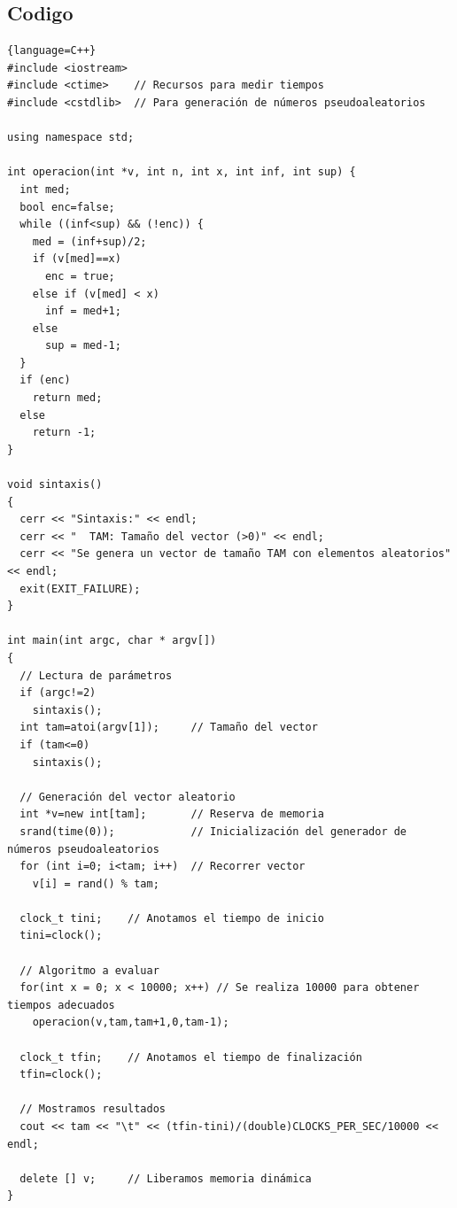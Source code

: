 \documentclass[12pt,a4psprt]{article}
\begin{document}
\subsection{Codigo}
\begin{lstlisting}{language=C++}
#include <iostream>
#include <ctime>    // Recursos para medir tiempos
#include <cstdlib>  // Para generación de números pseudoaleatorios

using namespace std;

int operacion(int *v, int n, int x, int inf, int sup) {
  int med;
  bool enc=false;
  while ((inf<sup) && (!enc)) {
    med = (inf+sup)/2; 
    if (v[med]==x) 
      enc = true;
    else if (v[med] < x) 
      inf = med+1;
    else
      sup = med-1;
  }
  if (enc) 
    return med;
  else 
    return -1;
}

void sintaxis()
{
  cerr << "Sintaxis:" << endl;
  cerr << "  TAM: Tamaño del vector (>0)" << endl;
  cerr << "Se genera un vector de tamaño TAM con elementos aleatorios" << endl;
  exit(EXIT_FAILURE);
}

int main(int argc, char * argv[])
{
  // Lectura de parámetros
  if (argc!=2)
    sintaxis();
  int tam=atoi(argv[1]);     // Tamaño del vector
  if (tam<=0)
    sintaxis();
  
  // Generación del vector aleatorio
  int *v=new int[tam];       // Reserva de memoria
  srand(time(0));            // Inicialización del generador de números pseudoaleatorios
  for (int i=0; i<tam; i++)  // Recorrer vector
    v[i] = rand() % tam;
  
  clock_t tini;    // Anotamos el tiempo de inicio
  tini=clock();

  // Algoritmo a evaluar
  for(int x = 0; x < 10000; x++) // Se realiza 10000 para obtener tiempos adecuados
    operacion(v,tam,tam+1,0,tam-1);
  
  clock_t tfin;    // Anotamos el tiempo de finalización
  tfin=clock();

  // Mostramos resultados
  cout << tam << "\t" << (tfin-tini)/(double)CLOCKS_PER_SEC/10000 << endl;
  
  delete [] v;     // Liberamos memoria dinámica
}

\end{lstlisting}
\end{document}
